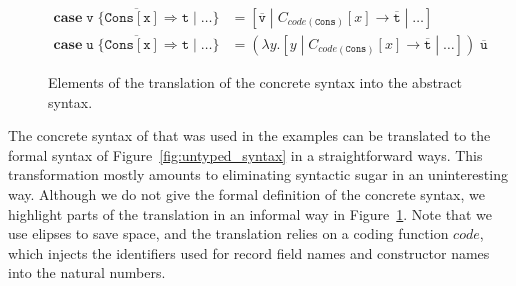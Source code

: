 \begin{figure}
\begin{minipage}{0.5\textwidth}
\begin{align*}
  \end{align*}
  \end{minipage}
  \begin{center}
  \begin{align*}
    \overline{\mathtt{\mathbf{case}\;v\;\{ Cons[x] ⇒ t\;|\;\dots\}}}
      &= [\overline{\mathtt{v}}\;|\; C_{code(\mathtt{Cons})}[x] →
         \overline{\mathtt{t}}\;|\; \dots]\\[1mm]
    \overline{\mathtt{\mathbf{case}\;u\;\{ Cons[x] ⇒ t\;|\;\dots\}}}
      &= (\lambda y.[y\;|\; C_{code(\mathtt{Cons})}[x] →
         \overline{\mathtt{t}}\;|\; \dots])\;\overline{\mathtt{u}}
  \end{align*}
  \end{center}
  \caption{Elements of the translation of the concrete syntax into the
  abstract syntax.}
  \label{fig:desugar}
\end{figure}

The concrete syntax of \pml that was used in the examples can be translated
to the formal syntax of Figure~\ref{fig:untyped_syntax} in a straightforward
ways. This transformation mostly amounts to eliminating syntactic sugar in an
uninteresting way. Although we do not give the formal definition of the
concrete syntax, we highlight parts of the translation in an informal way
in Figure~\ref{fig:desugar}. Note that we use elipses to save space, and the
translation relies on a coding function $code$, which injects the
identifiers used for record field names and constructor names into the
natural numbers.


